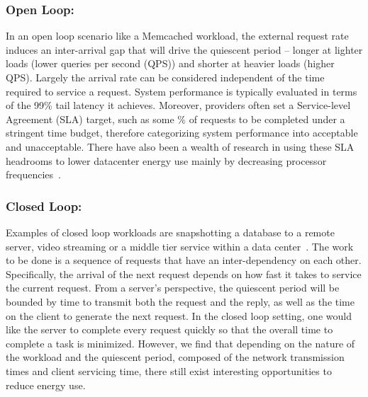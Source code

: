 \subsubsection{Open Loop:}
\label{sec:workflow:openloop}
In an open loop scenario like a Memcached workload, the external request rate induces an inter-arrival gap that will drive the quiescent period -- longer at lighter loads (lower queries per second (QPS)) and shorter at heavier loads (higher QPS). Largely the arrival rate can be considered independent of the time required to service a request.  System performance is typically evaluated in terms of the 99\% tail latency it achieves.  Moreover, providers often set a Service-level Agreement (SLA) target, such as some \% of requests to be completed under a stringent time budget, therefore categorizing system performance into acceptable and unacceptable. There have also been a wealth of research in using these SLA headrooms to lower datacenter energy use mainly by decreasing processor frequencies~\cite{Dynamo, SmoothOperator, oldi-pegasus, adrenaline, heracles, energyproportion, warehouse-power}.


\subsubsection{Closed Loop:}
\label{sec:workflow:closed_loop}
Examples of closed loop workloads are snapshotting a database to a remote server, video streaming or a middle tier service within a data center~\cite{Barroso:2009:DCI:1643608, oldi-study, oldi-pegasus, warehouse-power, energyproportion, WebSearch}.  The work to be done is a sequence of requests that have an inter-dependency on each other. Specifically, the arrival of the next request depends on how fast it takes to service the current request. From a server's perspective, the quiescent period will be bounded by time to transmit both the request and the reply, as well as the time on the client to generate the next request.  
In the closed loop setting, one would like the server to complete every request quickly so that the overall time to complete a task is minimized. However, we find that depending on the nature of the workload and the quiescent period, composed of the network transmission times and client servicing time, there still exist interesting opportunities to reduce energy use.

